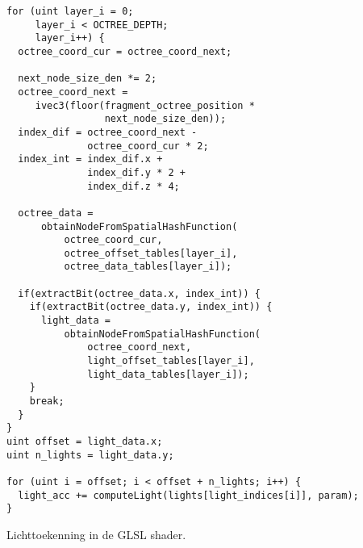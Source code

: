 \begin{listing}[p]
  \begin{verbatim}
for (uint layer_i = 0;
     layer_i < OCTREE_DEPTH;
     layer_i++) {
  octree_coord_cur = octree_coord_next;

  next_node_size_den *= 2;
  octree_coord_next =
     ivec3(floor(fragment_octree_position *
                 next_node_size_den));
  index_dif = octree_coord_next -
              octree_coord_cur * 2;
  index_int = index_dif.x +
              index_dif.y * 2 +
              index_dif.z * 4;

  octree_data =
      obtainNodeFromSpatialHashFunction(
          octree_coord_cur,
          octree_offset_tables[layer_i],
          octree_data_tables[layer_i]);
      
  if(extractBit(octree_data.x, index_int)) {
    if(extractBit(octree_data.y, index_int)) {
      light_data =
          obtainNodeFromSpatialHashFunction(
              octree_coord_next,
              light_offset_tables[layer_i],
              light_data_tables[layer_i]);
    }
    break;
  }
}
uint offset = light_data.x;
uint n_lights = light_data.y;

for (uint i = offset; i < offset + n_lights; i++) {
  light_acc += computeLight(lights[light_indices[i]], param);
}
  \end{verbatim}
  \caption{Lichttoekenning in de GLSL shader.}
  \label{lst:hs-lichttoekenning}
\end{listing}
